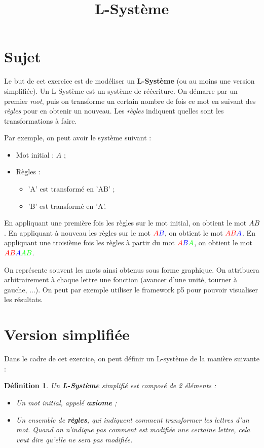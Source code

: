 \documentclass[a4paper,11pt,answers]{exam}
\title{L-Système}
\date{}
\newtheorem{definition}{Définition}
\begin{document}
	\maketitle{}
	
	\section{Sujet}\label{intro}
	Le but de cet exercice est de modéliser un \textbf{L-Système} (ou au moins une version simplifiée).
	Un L-Système est un système de réécriture. On démarre par un premier \emph{mot}, puis on transforme un certain nombre de fois ce mot en suivant des \emph{règles} pour en obtenir un nouveau. Les \emph{règles} indiquent quelles sont les transformations à faire.
	
	Par exemple, on peut avoir le système suivant :
	\begin{itemize}
		\item Mot initial : $A$ ;
		\item Règles :
		\begin{itemize}
			\item 'A' est transformé en 'AB' ;
			\item 'B' est transformé en 'A'.
		\end{itemize}
	\end{itemize}
	
	En appliquant une première fois les règles sur le mot initial, on obtient le mot $AB$.
	En appliquant à nouveau les règles sur le mot $\textcolor{red}{A}\textcolor{blue}{B}$, on obtient le mot $\textcolor{red}{AB}\textcolor{blue}{A}$. En appliquant une troisième fois les règles à partir du mot $\textcolor{red}{A}\textcolor{blue}{B}\textcolor{green}{A}$, on obtient le mot $\textcolor{red}{AB}\textcolor{blue}{A}\textcolor{green}{AB}$.
	
	On représente souvent les mots ainsi obtenus sous forme graphique. On attribuera arbitrairement à chaque lettre une fonction (avancer d'une unité, tourner à gauche, ...). On peut par exemple utiliser le framework p5 pour pouvoir visualiser les résultats.
	
	\section{Version simplifiée}
	Dans le cadre de cet exercice, on peut définir un L-système de la manière suivante :
	\begin{definition}
		Un \textbf{L-Système} simplifié est composé de 2 éléments :
		\begin{itemize}
			\item Un mot initial, appelé \textbf{axiome} ;
			\item Un ensemble de \textbf{règles}, qui indiquent comment transformer les lettres d'un mot. Quand on n'indique pas comment est modifiée une certaine lettre, cela veut dire qu'elle ne sera pas modifiée.
		\end{itemize}
	\end{definition}
	
\end{document}
